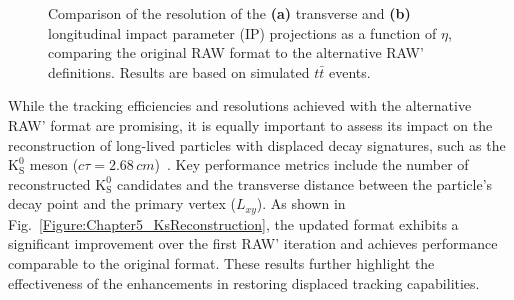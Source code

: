 \begin{figure}[h]
    \caption[Resolution of IP projections vs $\eta$ for RAW and RAW']{Comparison of the resolution of the \textbf{(a)} transverse and \textbf{(b)} longitudinal impact parameter (IP) projections as a function of $\eta$, comparing the original RAW format to the alternative RAW' definitions. Results are based on simulated $t\bar{t}$ events.}
    \label{Figure:Chapter5_ResolutionComparison}
\end{figure}

While the tracking efficiencies and resolutions achieved with the alternative RAW' format are promising, it is equally important to assess its impact on the reconstruction of long-lived particles with displaced decay signatures, such as the $\mathrm{K}_\mathrm{S}^0$ meson ($c\tau = 2.68\,\unit{cm}$)~\cite{ParticleMasses}. Key performance metrics include the number of reconstructed $\mathrm{K}_\mathrm{S}^0$ candidates and the transverse distance between the particle’s decay point and the primary vertex ($L_{xy}$). As shown in Fig.~\ref{Figure:Chapter5_KsReconstruction}, the updated format exhibits a significant improvement over the first RAW' iteration and achieves performance comparable to the original format. These results further highlight the effectiveness of the enhancements in restoring displaced tracking capabilities.

